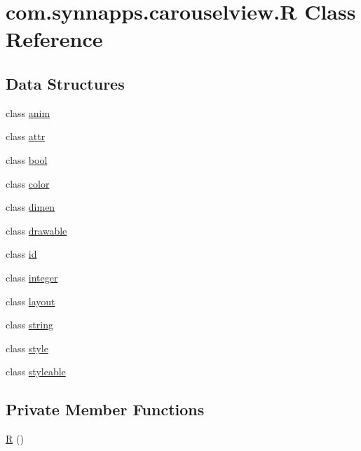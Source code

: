 \hypertarget{classcom_1_1synnapps_1_1carouselview_1_1_r}{}\section{com.\+synnapps.\+carouselview.\+R Class Reference}
\label{classcom_1_1synnapps_1_1carouselview_1_1_r}
\subsection*{Data Structures}
\begin{DoxyCompactItemize}
\item 
class \mbox{\hyperlink{classcom_1_1synnapps_1_1carouselview_1_1_r_1_1anim}{anim}}
\item 
class \mbox{\hyperlink{classcom_1_1synnapps_1_1carouselview_1_1_r_1_1attr}{attr}}
\item 
class \mbox{\hyperlink{classcom_1_1synnapps_1_1carouselview_1_1_r_1_1bool}{bool}}
\item 
class \mbox{\hyperlink{classcom_1_1synnapps_1_1carouselview_1_1_r_1_1color}{color}}
\item 
class \mbox{\hyperlink{classcom_1_1synnapps_1_1carouselview_1_1_r_1_1dimen}{dimen}}
\item 
class \mbox{\hyperlink{classcom_1_1synnapps_1_1carouselview_1_1_r_1_1drawable}{drawable}}
\item 
class \mbox{\hyperlink{classcom_1_1synnapps_1_1carouselview_1_1_r_1_1id}{id}}
\item 
class \mbox{\hyperlink{classcom_1_1synnapps_1_1carouselview_1_1_r_1_1integer}{integer}}
\item 
class \mbox{\hyperlink{classcom_1_1synnapps_1_1carouselview_1_1_r_1_1layout}{layout}}
\item 
class \mbox{\hyperlink{classcom_1_1synnapps_1_1carouselview_1_1_r_1_1string}{string}}
\item 
class \mbox{\hyperlink{classcom_1_1synnapps_1_1carouselview_1_1_r_1_1style}{style}}
\item 
class \mbox{\hyperlink{classcom_1_1synnapps_1_1carouselview_1_1_r_1_1styleable}{styleable}}
\end{DoxyCompactItemize}
\subsection*{Private Member Functions}
\begin{DoxyCompactItemize}
\item 
\mbox{\hyperlink{classcom_1_1synnapps_1_1carouselview_1_1_r_a5e75877ef0f4ca77bd243cb74dcfee95}{R}} ()
\end{DoxyCompactItemize}


